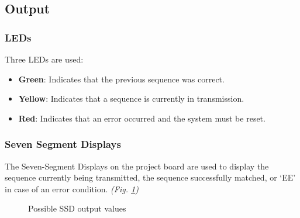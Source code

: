\documentclass[11pt,letterpaper,titlepage]{article}
\begin{document}
\subsection{Output}
\subsubsection{LEDs}\label{ssS:leds}

Three LEDs are used:
\begin{itemize}
	\item \textbf{Green}: Indicates that the previous sequence was correct.
	\item \textbf{Yellow}: Indicates that a sequence is currently in transmission.
	\item \textbf{Red}: Indicates that an error occurred and the system must be reset.
\end{itemize}


\subsubsection{Seven Segment Displays}\label{ssS:ssd}
The Seven-Segment Displays on the project board are used to display the sequence currently being transmitted, the sequence successfully matched, or `EE' in case of an error condition. \textit{(Fig. \ref{fig:SSD})}

\begin{figure}[!htb]
  \centering
  \quad
  \quad
  \caption{Possible SSD output values}
  \label{fig:SSD}
\end{figure}
\end{document}

